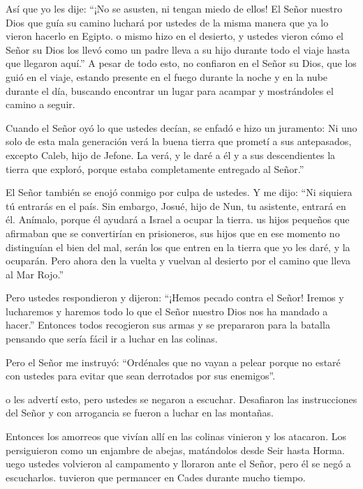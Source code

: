  Así que yo les dije: ``¡No se asusten, ni tengan miedo de
ellos!  El Señor nuestro Dios que guía su camino luchará
por ustedes de la misma manera que ya lo vieron hacerlo en Egipto.
 o mismo hizo en el desierto, y ustedes vieron cómo el
Señor su Dios los llevó como un padre lleva a su hijo durante todo el
viaje hasta que llegaron aquí.''  A pesar de todo esto, no
confiaron en el Señor su Dios,  que los guió en el viaje,
estando presente en el fuego durante la noche y en la nube durante el
día, buscando encontrar un lugar para acampar y mostrándoles el camino a
seguir.

 Cuando el Señor oyó lo que ustedes decían, se enfadó e
hizo un juramento:  Ni uno solo de esta mala generación
verá la buena tierra que prometí a sus antepasados, 
excepto Caleb, hijo de Jefone. La verá, y le daré a él y a sus
descendientes la tierra que exploró, porque estaba completamente
entregado al Señor.''

 El Señor también se enojó conmigo por culpa de ustedes. Y
me dijo: ``Ni siquiera tú entrarás en el país.  Sin
embargo, Josué, hijo de Nun, tu asistente, entrará en él. Anímalo,
porque él ayudará a Israel a ocupar la tierra.  us hijos
pequeños que afirmaban que se convertirían en prisioneros, sus hijos que
en ese momento no distinguían el bien del mal, serán los que entren en
la tierra que yo les daré, y la ocuparán.  Pero ahora den
la vuelta y vuelvan al desierto por el camino que lleva al Mar Rojo.''

 Pero ustedes respondieron y dijeron: ``¡Hemos pecado
contra el Señor! Iremos y lucharemos y haremos todo lo que el Señor
nuestro Dios nos ha mandado a hacer.'' Entonces todos recogieron sus
armas y se prepararon para la batalla pensando que sería fácil ir a
luchar en las colinas.

 Pero el Señor me instruyó: ``Ordénales que no vayan a
pelear porque no estaré con ustedes para evitar que sean derrotados por
sus enemigos''.

 o les advertí esto, pero ustedes se negaron a escuchar.
Desafiaron las instrucciones del Señor y con arrogancia se fueron a
luchar en las montañas.

 Entonces los amorreos que vivían allí en las colinas
vinieron y los atacaron. Los persiguieron como un enjambre de abejas,
matándolos desde Seir hasta Horma.  uego ustedes volvieron
al campamento y lloraron ante el Señor, pero él se negó a escucharlos.
 tuvieron que permancer en Cades durante mucho tiempo.


